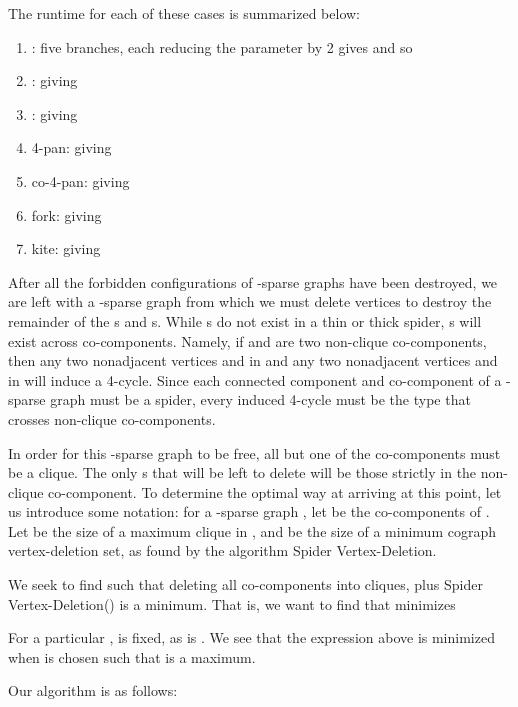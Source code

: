 \documentclass{llncs}
\begin{document}
The runtime for each of these cases is summarized below:

\begin{enumerate}
  \item : five branches, each reducing the parameter by 2 gives  and so 
  \item :  giving 
  \item :  giving 
  \item 4-pan:  giving 
  \item co-4-pan:  giving 
  \item fork:  giving 
  \item kite:  giving 
\end{enumerate}

After all the forbidden configurations of -sparse graphs have been destroyed, we are left with a -sparse graph from which we must delete vertices to destroy the remainder of the s and s. While s do not exist in a thin or thick spider, s will exist across co-components. Namely, if  and  are two non-clique co-components, then any two nonadjacent vertices  and  in  and any two nonadjacent vertices  and  in  will induce a 4-cycle. Since each connected component and co-component of a -sparse graph must be a spider, every induced 4-cycle must be the type that crosses non-clique co-components.

In order for this -sparse graph to be  free, all but one of the co-components must be a clique. The only s that will be left to delete will be those strictly in the non-clique co-component. To determine the optimal way at arriving at this point, let us introduce some notation: for a -sparse graph , let  be the co-components of . Let  be the size of a maximum clique in , and  be the size of a minimum cograph vertex-deletion set, as found by the algorithm {\sc Spider Vertex-Deletion}.

We seek to find  such that deleting all co-components  into cliques, plus {\sc Spider Vertex-Deletion}() is a minimum. That is, we want to find  that minimizes


For a particular ,  is fixed, as is . We see that the expression above is minimized when  is chosen such that  is a maximum.

Our algorithm is as follows:
\end{document}
